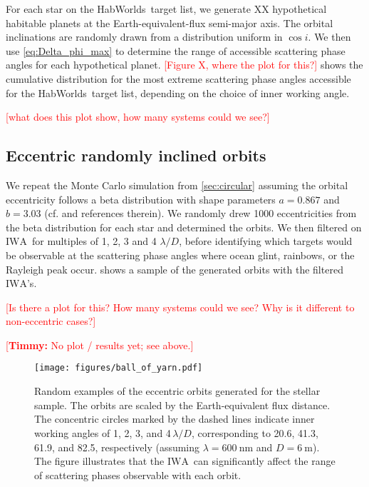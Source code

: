 \documentclass[
    usenatbib,
]{mnras}
\newcommand{\todo}[1]{\textcolor{red}{[#1]}}
\newcommand{\timmy}[1]{\textcolor{red}{[\textbf{Timmy:} #1]}}
\newcommand{\IWA}{\ensuremath{\mathrm{IWA}}}
\newcommand{\hwo}{HabWorlds}
\begin{document}
For each star on the \hwo\ target list, we generate XX hypothetical habitable planets at the Earth-equivalent-flux semi-major axis. 
%
The orbital inclinations are randomly drawn from a distribution uniform in $\cos i$. 
%
We then use \cref{eq:Delta_phi_max} to determine the range of accessible scattering phase angles for each hypothetical planet.
%
\todo{Figure X, where the plot for this?} shows the cumulative distribution for the most extreme scattering phase angles accessible for the \hwo\ target list, depending on the choice of inner working angle.  

\todo{what does this plot show, how many systems could we see?}


\subsection{Eccentric randomly inclined orbits}
\label{sec:eccentric}
We repeat the Monte Carlo simulation from \cref{sec:circular} assuming the orbital eccentricity follows a beta distribution with shape parameters $a=0.867$ and $b=3.03$ (cf. \citet{Guimond_2019} and references therein). 
%
We randomly drew 1000 eccentricities from the beta distribution for each star and determined the orbits. 
%
We then filtered on \IWA\ for multiples of 1, 2, 3 and 4 $\lambda / D$, before identifying which targets would be observable at the scattering phase angles where ocean glint, rainbows, or the Rayleigh peak occur. 
%
 shows a sample of the generated orbits with the filtered \IWA's. 
%

\todo{Is there a plot for this? How many systems could we see? Why is it different to non-eccentric cases?}

\timmy{No plot / results yet; see above.}

\begin{figure*}
    \centering
    \texttt{[image: figures/ball\_of\_yarn.pdf]}  
    \caption{
        Random examples of the eccentric orbits generated for the stellar sample.
        The orbits are scaled by the Earth-equivalent flux distance. 
        The concentric circles marked by the dashed lines indicate inner working angles of 1, 2, 3, and 4\,$\lambda / D$, corresponding to 20.6, 41.3, 61.9, and \SI{82.5}{\mas}, respectively (assuming $\lambda = \SI{600}{\nano\meter}$ and $D = \SI{6}{\meter}$).
        The figure illustrates that the \IWA\ can significantly affect the range of scattering phases observable with each orbit.
    }
    \label{fig:ball-o-yarn}
\end{figure*}
 
\end{document}

